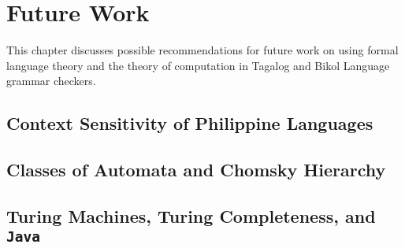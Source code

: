 \chapter{Future Work}
\label{future_work}

This chapter discusses possible recommendations for future work on using formal language theory and the theory of computation in Tagalog and Bikol Language grammar checkers.

\section{Context Sensitivity of Philippine Languages}

\section{Classes of Automata and Chomsky Hierarchy}

\section{Turing Machines, Turing Completeness, and \texttt{Java}}